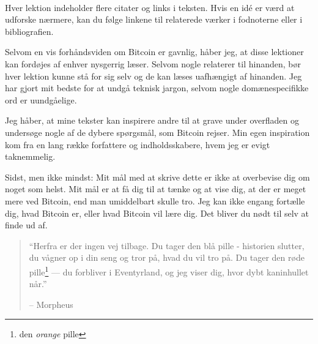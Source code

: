 \documentclass[paper=6in:9in,pagesize=pdftex,headinclude=on,footinclude=on,12pt]{scrbook}
\begin{document}
~

Hver lektion indeholder flere citater og links i teksten. Hvis en id\'e er værd at udforske nærmere, kan du følge linkene til relaterede værker i fodnoterne eller i bibliografien.

Selvom en vis forhåndsviden om Bitcoin er gavnlig, håber jeg, at disse lektioner kan fordøjes af enhver nysgerrig læser. Selvom nogle relaterer til hinanden, bør hver lektion kunne stå for sig selv og de kan læses uafhængigt af hinanden. Jeg har gjort mit bedste for at undgå teknisk jargon, selvom nogle domænespecifikke ord er uundgåelige.

Jeg håber, at mine tekster kan inspirere andre til at grave under overfladen og undersøge nogle af de dybere spørgsmål, som Bitcoin rejser. Min egen inspiration kom fra en lang række forfattere og indholdsskabere, hvem jeg er evigt taknemmelig.

Sidst, men ikke mindst: Mit mål med at skrive dette er ikke at overbevise dig om noget som helst. Mit mål er at få dig til at tænke og at vise dig, at der er meget mere ved Bitcoin, end man umiddelbart skulle tro. Jeg kan ikke engang fortælle dig, hvad Bitcoin er, eller hvad Bitcoin vil lære dig. Det bliver du nødt til selv at finde ud af.\begin{quotation}\begin{samepage}
\enquote{Herfra er der ingen vej tilbage. Du tager den blå pille - historien slutter, du vågner op i din seng og tror på, hvad du vil tro på. Du tager den røde pille\footnote{den \textit{orange} pille} --- du forbliver i Eventyrland, og jeg viser dig, hvor dybt kaninhullet når.}
\begin{flushright} -- Morpheus \end{flushright}\end{samepage}\end{quotation}
\end{document}
